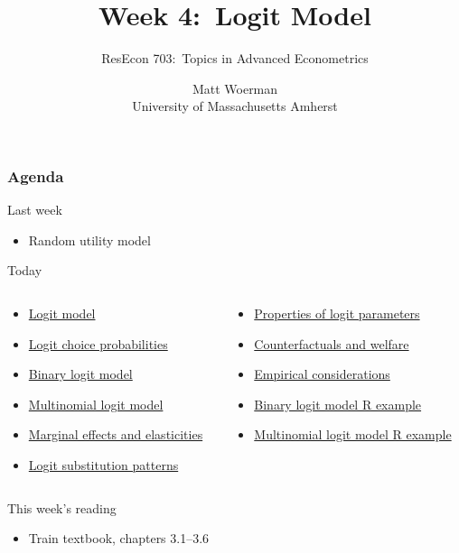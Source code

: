 \documentclass{beamer}
\title[Week 4:\ Logit Model]{Week 4:\ Logit Model}
\author[ResEcon 703:\ Advanced Econometrics]{ResEcon 703:\ Topics in Advanced Econometrics}
\date{Matt Woerman\\University of Massachusetts Amherst}
\begin{document}
{ 
\begin{frame}[noframenumbering]
    \titlepage
\end{frame}
}

\begin{frame}\frametitle{Agenda}
    Last week
    \begin{itemize}
        \item Random utility model
    \end{itemize}
    \vspace{2ex}
    Today
    \begin{columns}
        \begin{column}{0.5\textwidth}
            \begin{itemize}
                \item \hyperlink{page.\getpagerefnumber{logit}}{Logit model}
                \item \hyperlink{page.\getpagerefnumber{probs}}{Logit choice probabilities}
                \item \hyperlink{page.\getpagerefnumber{binary}}{Binary logit model}
                \item \hyperlink{page.\getpagerefnumber{multi}}{Multinomial logit model}
                \item \hyperlink{page.\getpagerefnumber{marginal}}{Marginal effects and elasticities}
                \item \hyperlink{page.\getpagerefnumber{subs}}{Logit substitution patterns}
            \end{itemize}
        \end{column}
        \begin{column}{0.5\textwidth}
            \begin{itemize}
                \item \hyperlink{page.\getpagerefnumber{params}}{Properties of logit parameters}
                \item \hyperlink{page.\getpagerefnumber{counter}}{Counterfactuals and welfare}
                \item \hyperlink{page.\getpagerefnumber{empirical}}{Empirical considerations}
                \item \hyperlink{page.\getpagerefnumber{binary_r}}{Binary logit model R example}
                \item \hyperlink{page.\getpagerefnumber{multi_r}}{Multinomial logit model R example}
            \end{itemize}
            \vspace{\fill}
        \end{column}
    \end{columns}
    \vspace{3ex}
    This week's reading
    \begin{itemize}
        \item Train textbook, chapters 3.1--3.6
    \end{itemize}
\end{frame}
\end{document}
